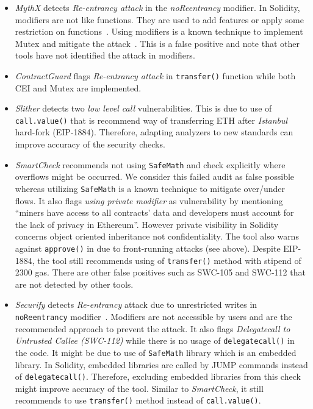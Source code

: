 \begin{itemize}
	\item \textit{MythX} detects \textit{Re-entrancy attack} in the \textit{noReentrancy} modifier. In Solidity, modifiers {\chg are not like functions. They are} used to add features or apply some restriction on functions~\cite{SolidityModifer}. Using modifiers is a known technique to implement Mutex and mitigate the attack~\cite{ReentrancyGuard}. This is a false positive and note that other tools have not identified the attack {\chg in modifiers}.

	\item {\chg\textit{ContractGuard} flags \textit{Re-entrancy attack} in \texttt{transfer()} function while both CEI and Mutex are implemented.}

	\item \textit{Slither} detects two \textit{low level call} vulnerabilities\cite{SlitherSetup}. This is due to use of \texttt{call.value()} that is recommend way of transferring ETH after \textit{Istanbul} hard-fork (EIP-1884).	Therefore, adapting analyzers to new standards can improve accuracy of the security checks.

	\item \textit{SmartCheck} recommends not using \texttt{SafeMath} and {\chg check explicitly where overflows might be occurred. We consider this failed audit as false possible whereas utilizing \texttt{SafeMath} is a known technique to mitigate over/under flows. It also flags \textit{using private modifier} as vulnerability by mentioning} ``miners have access to all contracts' data and developers must account for the lack of privacy in Ethereum''. However private visibility in Solidity concerns object oriented inheritance not confidentiality. The tool also warns against \texttt{approve()} in \erc due to front-running attacks (see above). Despite EIP-1884, the tool still recommends using of \texttt{transfer()} method with stipend of 2300 gas. {\chg There are other false positives such as SWC-105 and SWC-112 that are not detected by other tools.}

	\item \textit{Securify} detects \textit{Re-entrancy} attack due to unrestricted writes in \texttt{noReentrancy} modifier~\cite{SECURIFY}. Modifiers are not accessible by users and are the recommended approach to prevent the attack. {\chg It also flags \textit{Delegatecall to Untrusted Callee (SWC-112)} while there is no usage of \texttt{delegatecall()} in the code. It might be due to use of \texttt{SafeMath} library which is an embedded library. In Solidity, embedded libraries are called by JUMP commands instead of \texttt{delegatecall()}. Therefore, excluding embedded libraries from this check might improve accuracy of the tool. Similar to \textit{SmartCheck}, it still recommends to use \texttt{transfer()} method instead of \texttt{call.value()}}.


\end{itemize}
